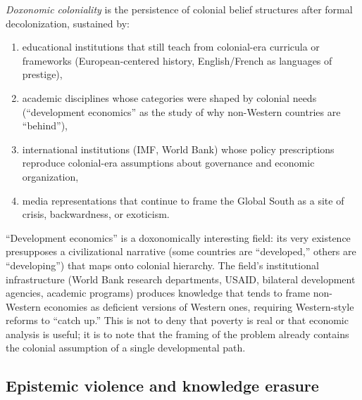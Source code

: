 \begin{definition}
\label{def:coloniality}
\emph{Doxonomic coloniality} is the persistence of colonial belief structures after formal decolonization, sustained by:
\begin{enumerate}[nosep]
  \item educational institutions that still teach from colonial-era curricula or frameworks (European-centered history, English/French as languages of prestige),
  \item academic disciplines whose categories were shaped by colonial needs (``development economics'' as the study of why non-Western countries are ``behind''),
  \item international institutions (IMF, World Bank) whose policy prescriptions reproduce colonial-era assumptions about governance and economic organization,
  \item media representations that continue to frame the Global South as a site of crisis, backwardness, or exoticism.
\end{enumerate}
\end{definition}

\begin{example}
\label{ex:development-economics}
``Development economics'' is a doxonomically interesting field: its very existence presupposes a civilizational narrative (some countries are ``developed,'' others are ``developing'') that maps onto colonial hierarchy.
The field's institutional infrastructure (World Bank research departments, USAID, bilateral development agencies, academic programs) produces knowledge that tends to frame non-Western economies as deficient versions of Western ones, requiring Western-style reforms to ``catch up.''
This is not to deny that poverty is real or that economic analysis is useful; it is to note that the framing of the problem already contains the colonial assumption of a single developmental path.
\end{example}

\subsection{Epistemic violence and knowledge erasure}

